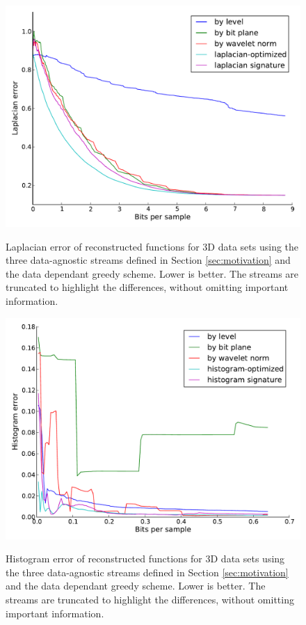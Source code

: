 \begin{figure}
  \centering
 	{\includegraphics[width=0.48\linewidth]{img/motivation-3d/laplacian-turbulence.pdf}}
 	\caption{Laplacian error of reconstructed functions for 3D data sets using the three data-agnostic streams
 	defined in Section \ref{sec:motivation} and the data dependant greedy scheme. Lower is better.
        The streams are truncated to highlight
 	the differences, without omitting important information.}
 	\label{fig:motivation-3d-laplacian}
\end{figure}


\begin{figure}
  \centering
 	{\includegraphics[width=0.48\linewidth]{img/motivation-3d/histogram-turbulence.pdf}}
 	\caption{Histogram error of reconstructed functions for 3D data sets using the three data-agnostic streams
 	defined in Section \ref{sec:motivation} and the data dependant greedy scheme. Lower is better.
        The streams are truncated to highlight
 	the differences, without omitting important information.}
 	\label{fig:motivation-3d-histogram}
\end{figure}

